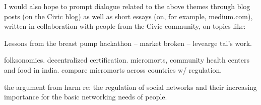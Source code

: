 \documentclass[12pt]{article}
\begin{document}
I would also hope to prompt dialogue related to the above themes through blog posts (on the Civic blog) as well as short essays (on, for example, medium.com), written in collaboration with people from the Civic community, on topics like:

\begin{description}

\item[``Hidden Needs.''] Lessons from the breast pump hackathon -- market broken -- levearge tal's work.
\item[``Dangerous Toys.''] folksonomies. decentralized certification. micromorts, community health centers and food in india. compare micromorts across countries w/ regulation.
\item[``Social Network Regulation?''] the argument from harm re: the regulation of social networks and their increasing importance for the basic networking needs of people.
\item

\end{description}
\end{document}
